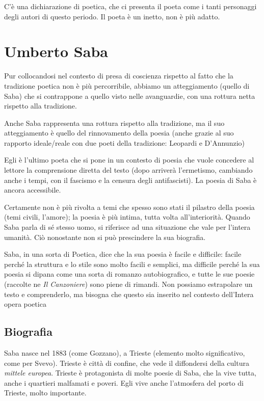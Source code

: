 C’è una dichiarazione di poetica, che ci presenta il poeta come i tanti personaggi degli autori di questo periodo. Il poeta è un inetto, non è più adatto.

\chapter{Umberto Saba}

Pur collocandosi nel contesto di presa di coscienza rispetto al fatto che la tradizione poetica non è più percorribile, abbiamo un atteggiamento (quello di Saba) che si contrappone a quello visto nelle avanguardie, con una rottura netta rispetto alla tradizione.

Anche Saba rappresenta una rottura rispetto alla tradizione, ma il suo atteggiamento è quello del rinnovamento della poesia (anche grazie al suo rapporto ideale/reale con due poeti della tradizione: Leopardi e D’Annunzio)

Egli è l’ultimo poeta che si pone in un contesto di poesia che vuole concedere al lettore la comprensione diretta del testo (dopo arriverà l’ermetismo, cambiando anche i tempi, con il fascismo e la censura degli antifascisti). La poesia di Saba è ancora accessibile.

Certamente non è più rivolta a temi che spesso sono stati il pilastro della poesia (temi civili, l’amore); la poesia è più intima, tutta volta all’interiorità. 
Quando Saba parla di sé stesso uomo, si riferisce ad una situazione che vale per l’intera umanità.
Ciò nonostante non si può prescindere la sua biografia.

Saba, in una sorta di Poetica, dice che la sua poesia è facile e difficile: facile perché la struttura e lo stile sono molto facili e semplici, ma difficile perché la sua poesia si dipana come una sorta di romanzo autobiografico, e tutte le sue poesie (raccolte ne \textit{Il Canzoniere}) sono piene di rimandi.
Non possiamo estrapolare un testo e comprenderlo, ma bisogna che questo sia inserito nel contesto dell’Intera opera poetica

\section{Biografia}

Saba nasce nel 1883 (come Gozzano), a Trieste (elemento molto significativo, come per Svevo).
Trieste è città di confine, che vede il diffondersi della cultura \textit{mittele europea}.
Trieste è protagonista di molte poesie di Saba, che la vive tutta, anche i quartieri malfamati e poveri. Egli vive anche l’atmosfera del porto di Trieste, molto importante.

